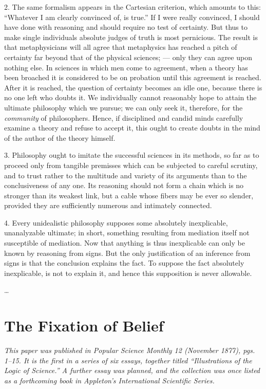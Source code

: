 \documentclass[]{article}
\begin{document}
2. The same formalism appears in the Cartesian criterion, which amounts to this: ``Whatever I am clearly convinced of, is true.'' If I were really convinced, I should have done with reasoning and should require no test of certainty. But thus to make single individuals absolute judges of truth is most pernicious. The result is that metaphysicians will all agree that metaphysics has reached a pitch of certainty far beyond that of the physical sciences; --- only they can agree upon nothing else. In sciences in which men come to agreement, when a theory has been broached it is considered to be on probation until this agreement is reached. After it is reached, the question of certainty becomes an idle one, because there is no one left who doubts it. We individually cannot reasonably hope to attain the ultimate philosophy which we pursue; we can only seek it, therefore, for the \emph{community} of philosophers. Hence, if disciplined and candid minds carefully examine a theory and refuse to accept it, this ought to create doubts in the mind of the author of the theory himself.

3. Philosophy ought to imitate the successful sciences in its methods, so far as to proceed only from tangible premisses which can be subjected to careful scrutiny, and to trust rather to the multitude and variety of its arguments than to the conclusiveness of any one. Its reasoning should not form a chain which is no stronger than its weakest link, but a cable whose fibers may be ever so slender, provided they are sufficiently numerous and intimately connected.

4. Every unidealistic philosophy supposes some absolutely inexplicable, unanalyzable ultimate; in short, something resulting from mediation itself not susceptible of mediation. Now that anything is thus inexplicable can only be known by reasoning from signs. But the only justification of an inference from signs is that the conclusion explains the fact. To suppose the fact absolutely inexplicable, is not to explain it, and hence this supposition is never allowable.

\ldots



\section*{The Fixation of Belief}
\emph{This paper was published in \emph{Popular Science Monthly} 12 (November 1877), pgs. 1--15. It is the first in a series of six essays, together titled ``Illustrations of the Logic of Science.'' A further essay was planned, and the collection was once listed as a forthcoming book in Appleton's International Scientific Series.}
\end{document}
